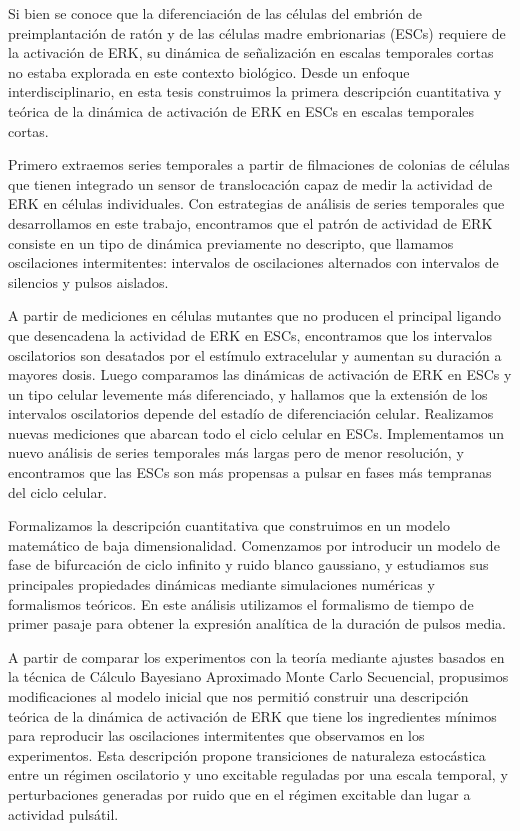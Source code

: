 \documentclass[./main.tex]{subfiles}
\begin{document}

Si bien se conoce que la diferenciación de las células del embrión de preimplantación de ratón y de las células madre embrionarias (ESCs) requiere de la activación de ERK, su dinámica de señalización en escalas temporales cortas no estaba explorada en este contexto biológico. Desde un enfoque interdisciplinario, en esta tesis construimos la primera descripción cuantitativa y teórica de la dinámica de activación de ERK en ESCs en escalas temporales cortas. 

Primero extraemos series temporales a partir de filmaciones de colonias de células que tienen integrado un sensor de translocación capaz de medir la actividad de ERK en células individuales. Con estrategias de análisis de series temporales que desarrollamos en este trabajo, encontramos que el patrón de actividad de ERK consiste en un tipo de dinámica previamente no descripto, que llamamos oscilaciones intermitentes: intervalos de oscilaciones alternados con intervalos de silencios y pulsos aislados. 

A partir de mediciones en células mutantes que no producen el principal ligando que desencadena la actividad de ERK en ESCs, encontramos que los intervalos oscilatorios son desatados por el estímulo extracelular y aumentan su duración a mayores dosis. Luego comparamos las dinámicas de activación de ERK en ESCs y un tipo celular levemente más diferenciado, y hallamos que la extensión de los intervalos oscilatorios depende del estadío de diferenciación celular. Realizamos nuevas mediciones que abarcan todo el ciclo celular en ESCs. Implementamos un nuevo análisis de series temporales más largas pero de menor resolución, y encontramos que las ESCs son más propensas a pulsar en fases más tempranas del ciclo celular.


Formalizamos la descripción cuantitativa que construimos en un modelo matemático de baja dimensionalidad. Comenzamos por introducir un modelo de fase de bifurcación de ciclo infinito y ruido blanco gaussiano, y estudiamos sus principales propiedades dinámicas mediante simulaciones numéricas y formalismos teóricos. En este análisis utilizamos el formalismo de tiempo de primer pasaje para obtener la expresión analítica de la duración de pulsos media. 

A partir de comparar los experimentos con la teoría mediante ajustes basados en la técnica de Cálculo Bayesiano Aproximado Monte Carlo Secuencial, propusimos modificaciones al modelo inicial que nos permitió construir una descripción teórica de la dinámica de activación de ERK que tiene los ingredientes mínimos para reproducir las oscilaciones intermitentes que observamos en los experimentos. Esta descripción propone transiciones de naturaleza estocástica entre un régimen oscilatorio y uno excitable reguladas por una escala temporal, y perturbaciones generadas por ruido que en el régimen excitable dan lugar a actividad pulsátil.
\end{document}
